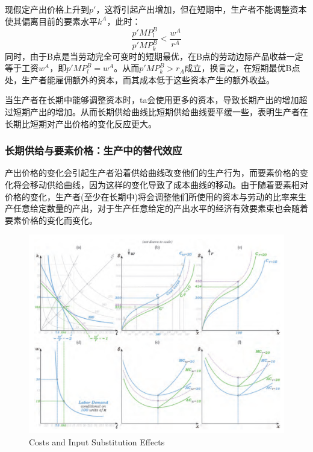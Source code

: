 \documentclass{article}
\begin{document}
现假定产出价格上升到$ p' $，这将引起产出增加，但在短期中，生产者不能调整资本使其偏离目前的要素水平$ k^A $，此时：
\[
\frac{p'MP^B_l}{p'MP^B_k}<\frac{w^A}{r^A}
\]
同时，由于B点是当劳动完全可变时的短期最优，在B点的劳动边际产品收益一定等于工资$ w^A $，即$ p'MP^B_l=w^A $。从而$ p'MP^B_k>r_A $成立，换言之，在短期最优B点处，生产者能雇佣额外的资本，而其成本低于这些资本产生的额外收益。

当生产者在长期中能够调整资本时，ta会使用更多的资本，导致长期产出的增加超过短期产出的增加。从而长期供给曲线比短期供给曲线要平缓一些，表明生产者在长期比短期对产出价格的变化反应更大。

\subsubsection{长期供给与要素价格：生产中的替代效应}

产出价格的变化会引起生产者沿着供给曲线改变他们的生产行为，而要素价格的变化将会移动供给曲线，因为这样的变化导致了成本曲线的移动。由于随着要素相对价格的变化，生产者(至少在长期中)将会调整他们所使用的资本与劳动的比率来生产任意给定数量的产出，对于生产任意给定的产出水平的经济有效要素束也会随着要素价格的变化而变化。

\begin{figure}[H] %
	\centering %
	\includegraphics[width=1\textwidth]{13_7} %
	\caption{Costs and Input Substitution Effects} %
	\label{Fig.main8} %
\end{figure}
\end{document}
